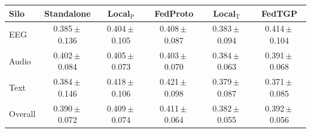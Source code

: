 \begin{tabular}{lccccc}
\toprule
\textbf{Silo} & \textbf{Standalone} & \textbf{Local$_{\mathrm{P}}$} & \textbf{FedProto} & \textbf{Local$_{\mathrm{T}}$} & \textbf{FedTGP} \\
\midrule
EEG & 0.385\,$\pm$\,0.136 & 0.404\,$\pm$\,0.105 & 0.408\,$\pm$\,0.087 & 0.383\,$\pm$\,0.094 & 0.414\,$\pm$\,0.104 \\
Audio & 0.402\,$\pm$\,0.084 & 0.405\,$\pm$\,0.073 & 0.403\,$\pm$\,0.070 & 0.384\,$\pm$\,0.063 & 0.391\,$\pm$\,0.068 \\
Text & 0.384\,$\pm$\,0.146 & 0.418\,$\pm$\,0.106 & 0.421\,$\pm$\,0.098 & 0.379\,$\pm$\,0.087 & 0.371\,$\pm$\,0.085 \\
\midrule
Overall & 0.390\,$\pm$\,0.072 & 0.409\,$\pm$\,0.074 & 0.411\,$\pm$\,0.064 & 0.382\,$\pm$\,0.055 & 0.392\,$\pm$\,0.056 \\
\bottomrule
\end{tabular}